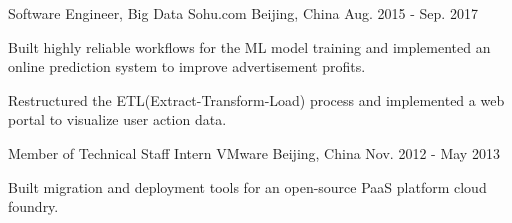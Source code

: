 \begin{cventries}
  \cventry
    {Software Engineer, Big Data} %
    {Sohu.com} %
    {Beijing, China} %
    {Aug. 2015 - Sep. 2017} %
    {
        \begin{cvitems}
          \item{Built highly reliable workflows for the ML model training and implemented an online prediction system to improve advertisement profits.}
          \item{Restructured the ETL(Extract-Transform-Load) process and implemented a web portal to visualize user action data.}
        \end{cvitems}
    }
    
  \cventry
    {Member of Technical Staff Intern} %
    {VMware} %
    {Beijing, China} %
    {Nov. 2012 - May 2013} %
    {
      \begin{cvitems}
        \item{Built migration and deployment tools for an open-source PaaS platform cloud foundry.}
      \end{cvitems}
    }

\end{cventries}
